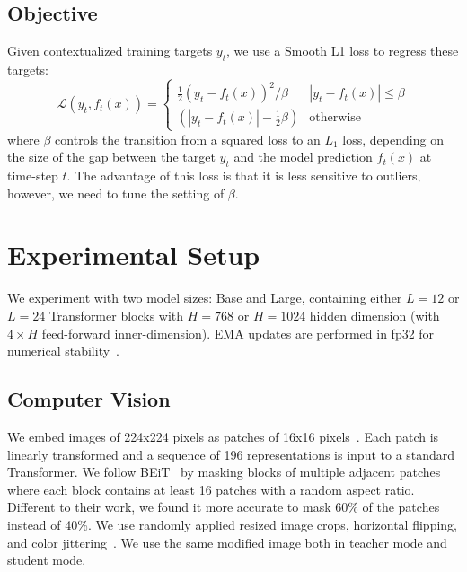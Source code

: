 \documentclass[nohyperref]{article}
\theoremstyle{plain}
\theoremstyle{definition}
\theoremstyle{remark}
\begin{document}
\subsection{Objective}

Given contextualized training targets $y_t$, we use a Smooth L1 loss to regress these targets:
\begin{equation}
\mathcal{L}(y_t, f_t(x)) = 
\begin{cases}
\frac{1}{2} (y_t - f_t(x))^2/\beta & | y_t - f_t(x) | \leq \beta \\
(|y_t-f_t(x)|-\frac{1}{2}\beta) & \text{otherwise}
\end{cases}
\nonumber
\end{equation}
where $\beta$ controls the transition from a squared loss to an $L_1$ loss, depending on the size of the gap between the target $y_t$ and the model prediction $f_t(x)$ at time-step $t$. 
The advantage of this loss is that it is less sensitive to outliers, however, we need to tune the setting of $\beta$. 




\section{Experimental Setup}
\label{sec:setup}

We experiment with two model sizes: \name{} Base and \name{} Large, containing either $L=12$ or $L=24$ Transformer blocks with $H=768$ or $H=1024$ hidden dimension (with $4\times H$ feed-forward inner-dimension). 
EMA updates are performed in fp32 for numerical stability~\citep{manohar2021kaizen}.


\subsection{Computer Vision}
\label{sec:setup_cv}

We embed images of 224x224 pixels as patches of 16x16 pixels~\citep{dosovitskiy2020vit}.
Each patch is linearly transformed and a sequence of 196 representations is input to a standard Transformer.
We follow BEiT~\citep{bao2021beit} by masking blocks of multiple adjacent patches where each block contains at least 16 patches with a random aspect ratio.
Different to their work, we found it more accurate to mask 60\% of the patches instead of 40\%.
We use randomly applied resized image crops, horizontal flipping, and color jittering~\citep{bao2021beit}. 
We use the same modified image both in teacher mode and student mode.
\end{document}
